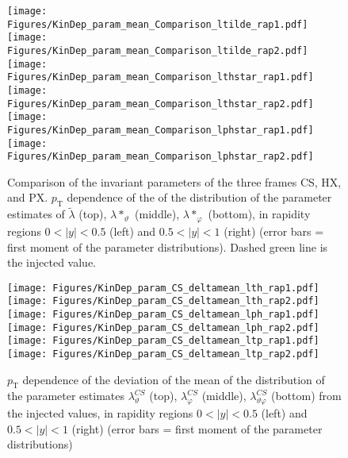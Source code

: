 \documentclass[12pt]{article}
\newcommand{\pT}{p_\mathrm{T}}
\newcommand{\absy}{\left |  y \right |}
\newcommand{\lamtilde}{\tilde{\lambda}}
\newcommand{\lamthstar}{\lambda*_\vartheta}
\newcommand{\lamphstar}{\lambda*_\varphi}
\newcommand{\lamthCS}{\lambda^{\scriptscriptstyle CS}_\vartheta}
\newcommand{\lamphCS}{\lambda^{\scriptscriptstyle CS}_\varphi}
\newcommand{\lamthphCS}{\lambda^{\scriptscriptstyle CS}_{\vartheta \varphi}}
\begin{document}




\begin{figure}[htbp]
\centering
\texttt{[image: Figures/KinDep\_param\_mean\_Comparison\_ltilde\_rap1.pdf]}
\texttt{[image: Figures/KinDep\_param\_mean\_Comparison\_ltilde\_rap2.pdf]}
\texttt{[image: Figures/KinDep\_param\_mean\_Comparison\_lthstar\_rap1.pdf]}
\texttt{[image: Figures/KinDep\_param\_mean\_Comparison\_lthstar\_rap2.pdf]}
\texttt{[image: Figures/KinDep\_param\_mean\_Comparison\_lphstar\_rap1.pdf]}
\texttt{[image: Figures/KinDep\_param\_mean\_Comparison\_lphstar\_rap2.pdf]}
\caption{Comparison of the invariant parameters of the three frames CS, HX,
and PX. $\pT$ dependence of the of the distribution of the
parameter estimates of $\lamtilde$ (top), $\lamthstar$ (middle), $\lamphstar$ (bottom), in rapidity regions $0<\absy<0.5$ (left) and
$0.5<\absy<1$ (right) (error bars = first moment of the parameter
distributions). Dashed green line is the injected value.}
\end{figure}
\clearpage











\begin{figure}[htbp]
\centering
\texttt{[image: Figures/KinDep\_param\_CS\_deltamean\_lth\_rap1.pdf]}
\texttt{[image: Figures/KinDep\_param\_CS\_deltamean\_lth\_rap2.pdf]}
\texttt{[image: Figures/KinDep\_param\_CS\_deltamean\_lph\_rap1.pdf]}
\texttt{[image: Figures/KinDep\_param\_CS\_deltamean\_lph\_rap2.pdf]}
\texttt{[image: Figures/KinDep\_param\_CS\_deltamean\_ltp\_rap1.pdf]}
\texttt{[image: Figures/KinDep\_param\_CS\_deltamean\_ltp\_rap2.pdf]}
\caption{$\pT$ dependence of the deviation of the mean of the distribution of
the parameter estimates $\lamthCS$ (top), $\lamphCS$ (middle), $\lamthphCS$
(bottom) from the injected values, in rapidity regions $0<\absy<0.5$ (left) and
$0.5<\absy<1$ (right) (error bars = first moment of the parameter
distributions)}
\end{figure}
\clearpage
\end{document}
